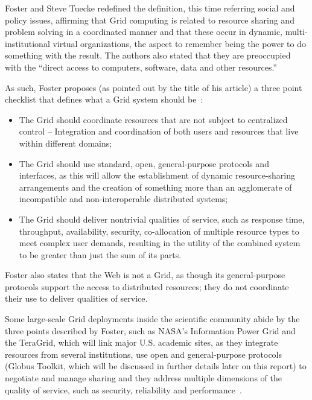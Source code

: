 Foster and Steve Tuecke redefined the definition, this time referring social and policy issues, affirming that Grid computing is related to resource sharing and problem solving in a coordinated manner and that these occur in dynamic, multi-institutional virtual organizations, the aspect to remember being the power to do something with the result. The authors also stated that they are preoccupied with the ``direct access to computers, software, data and other resources.''

As such, Foster proposes (as pointed out by the title of his article) a three point checklist that defines what a Grid system should be~\cite{Foster_2002}:
\begin{itemize}
\item The Grid should coordinate resources that are not subject to centralized control – Integration and coordination of both users and resources that live within different domains;
\item The Grid should use standard, open, general-purpose protocols and interfaces, as this will allow the establishment of dynamic resource-sharing arrangements and the creation of something more than an agglomerate of incompatible and non-interoperable distributed systems;
\item The Grid should deliver nontrivial qualities of service, such as response time, throughput, availability, security, co-allocation of multiple resource types to meet complex user demands, resulting in the utility of the combined system to be greater than just the sum of its parts.
\end{itemize}

Foster also states that the Web is not a Grid, as though its general-purpose protocols support the access to distributed resources; they do not coordinate their use to deliver qualities of service.

Some large-scale Grid deployments inside the scientific community abide by the three points described by Foster, such as NASA’s Information Power Grid and the TeraGrid, which will link major U.S. academic sites, as they integrate resources from several institutions, use open and general-purpose protocols (Globus Toolkit, which will be discussed in further details later on this report) to negotiate and manage sharing and they address multiple dimensions of the quality of service, such as security, reliability and performance~\cite{Foster_2002}.

